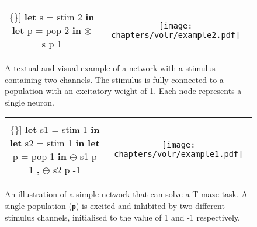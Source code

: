 \begin{figure}
  \ContinuedFloat*
  \begin{tabular}[t]{c c}
    \begin{minipage}{0.5\textwidth}
      \begin{Verbatim}[mathescape,commandchars=\\\{\}]
\textbf{let} s = stim 2 \textbf{in}
  \textbf{let} p = pop 2 \textbf{in}
      $\otimes$ s p 1
      \end{Verbatim}
    \end{minipage} & \begin{minipage}{0.5\textwidth}
      \texttt{[image: chapters/volr/example2.pdf]}
    \end{minipage}

  \end{tabular}
  \caption{A textual and visual example of a network
    with a stimulus containing two channels. 
    The stimulus is fully connected to a population with an excitatory
    weight of 1. Each node represents a single neuron.}
  \label{fig:volr-example1}
\end{figure}

\begin{figure}
  \ContinuedFloat
  \begin{tabular}[t]{c c}
    \begin{minipage}{0.5\textwidth}
      \begin{Verbatim}[mathescape,commandchars=\\\{\}]
\textbf{let} s1 = stim 1 \textbf{in}
  \textbf{let} s2 = stim 1 \textbf{in}
    \textbf{let} p = pop 1 \textbf{in}
      $\ominus$ s1 p 1 \textbf{,} $\ominus$ s2 p -1
      \end{Verbatim}
    \end{minipage} & \begin{minipage}{0.5\textwidth}
      \texttt{[image: chapters/volr/example1.pdf]}
    \end{minipage}
  \end{tabular}
  \caption{An illustration of a simple network that can solve a
    T-maze task. A single population (\texttt{\textbf{p}}) is 
    excited and inhibited by two different stimulus channels, initialised
    to the value of 1 and -1 respectively.}
\end{figure}

